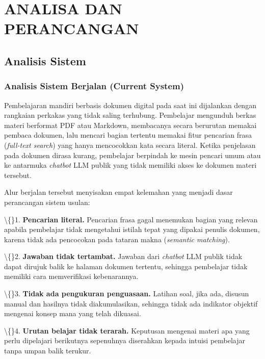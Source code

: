 \documentclass[12pt,a4paper]{article}
\begin{document}
\section*{ANALISA DAN PERANCANGAN}

\subsection*{Analisis Sistem}

\subsubsection*{Analisis Sistem Berjalan (Current System)}

Pembelajaran mandiri berbasis dokumen digital pada saat ini dijalankan dengan rangkaian perkakas yang tidak saling terhubung. Pembelajar mengunduh berkas materi berformat PDF atau Markdown, membacanya secara berurutan memakai pembaca dokumen, lalu mencari bagian tertentu memakai fitur pencarian frasa (\textit{full-text search}) yang hanya mencocokkan kata secara literal. Ketika penjelasan pada dokumen dirasa kurang, pembelajar berpindah ke mesin pencari umum atau ke antarmuka \textit{chatbot} LLM publik yang tidak memiliki akses ke dokumen materi tersebut.



Alur berjalan tersebut menyisakan empat kelemahan yang menjadi dasar perancangan sistem usulan:



\textbackslash\{\}1. \textbf{Pencarian literal.} Pencarian frasa gagal menemukan bagian yang relevan apabila pembelajar tidak mengetahui istilah tepat yang dipakai penulis dokumen, karena tidak ada pencocokan pada tataran makna (\textit{semantic matching}).



\textbackslash\{\}2. \textbf{Jawaban tidak tertambat.} Jawaban dari \textit{chatbot} LLM publik tidak dapat dirujuk balik ke halaman dokumen tertentu, sehingga pembelajar tidak memiliki cara memverifikasi kebenarannya.



\textbackslash\{\}3. \textbf{Tidak ada pengukuran penguasaan.} Latihan soal, jika ada, disusun manual dan hasilnya tidak diakumulasikan, sehingga tidak ada indikator objektif mengenai konsep mana yang telah dikuasai.



\textbackslash\{\}4. \textbf{Urutan belajar tidak terarah.} Keputusan mengenai materi apa yang perlu dipelajari berikutnya sepenuhnya diserahkan kepada intuisi pembelajar tanpa umpan balik terukur.
\end{document}
